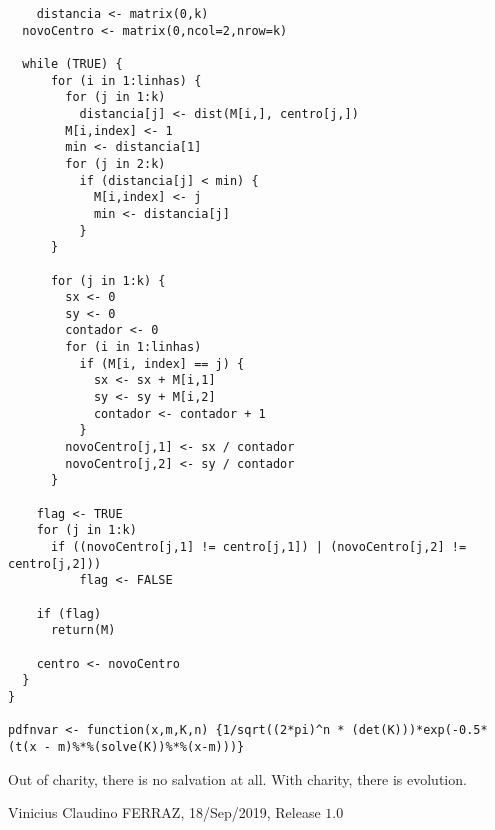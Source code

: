 \documentclass[12pt]{article}
\begin{document}
\begin{verbatim}
	distancia <- matrix(0,k)
  novoCentro <- matrix(0,ncol=2,nrow=k)

  while (TRUE) {
	  for (i in 1:linhas) {
	    for (j in 1:k)
	      distancia[j] <- dist(M[i,], centro[j,])
	    M[i,index] <- 1
	    min <- distancia[1]
	    for (j in 2:k)
	      if (distancia[j] < min) {
	        M[i,index] <- j
	        min <- distancia[j]
	      }
	  }

	  for (j in 1:k) {
	    sx <- 0
	    sy <- 0
	    contador <- 0
	    for (i in 1:linhas)
	      if (M[i, index] == j) {
	        sx <- sx + M[i,1]
	        sy <- sy + M[i,2]
	        contador <- contador + 1
	      }
	    novoCentro[j,1] <- sx / contador
	    novoCentro[j,2] <- sy / contador
	  }

    flag <- TRUE
    for (j in 1:k)
  	  if ((novoCentro[j,1] != centro[j,1]) | (novoCentro[j,2] != centro[j,2]))
	      flag <- FALSE

    if (flag)
      return(M)

    centro <- novoCentro
  }
}

pdfnvar <- function(x,m,K,n) {1/sqrt((2*pi)^n * (det(K)))*exp(-0.5*(t(x - m)%*%(solve(K))%*%(x-m)))}
\end{verbatim}

\vspace{3mm}

Out of charity, there is no salvation at all. With charity, there is evolution.

\vspace{3mm}

Vinicius Claudino FERRAZ, 18/Sep/2019, Release $1.0$
\end{document}
